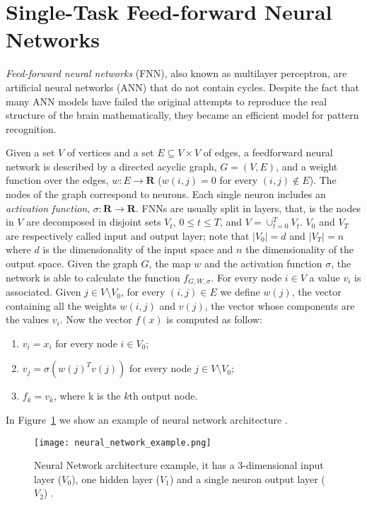 \section{Single-Task Feed-forward Neural Networks} \label{sec:singletaskNN}
\emph{Feed-forward neural networks} (FNN), also known as multilayer perceptron, are artificial neural networks (ANN) that do not contain cycles. Despite the fact that many ANN models have failed the original attempts to reproduce the real structure of the brain mathematically, they became an efficient model for pattern recognition. 

Given a set $V$ of vertices and a set  $E\subseteq V\times V$ of edges, a feedforward neural network is described by a directed acyclic graph, $G =
(V,E)$, and a weight function over the edges, $w : E \to \mathbf R$ ($w(i, j) = 0$
for every $(i, j) \notin E$). The nodes of the graph correspond to neurons. Each
single neuron includes an \emph{activation function},  $ \sigma : \mathbf R \to
\mathbf R$. FNNs are usually
split in layers, that, is the nodes in $V$ are decomposed in disjoint sets $V_t$, $0\leq t\leq T$,
and $V = \cup_{t = 0}^T V_t$. $V_0$ and
$V_T$ are respectively called input and output layer; note that $|V_0| = d$ and
$|V_T| = n$ where $d$ is the dimensionality of the input space and $n$ the
dimensionality of the output space. Given the graph $G$, the map $w$ and the
activation function $\sigma$, the network is able to calculate the function
$f_{G,W,\sigma}$. For every node $i \in V$ a value $v_i$ is associated. Given $j
\in V \setminus V_0$, for every $(i, j) \in E$ we define $w(j)$, the vector containing all
the weights $w(i, j)$ and $v(j)$, the vector whose components are the values $v_i$. Now the
vector $f(x)$ is computed as follow:
\begin{enumerate}
    \item $v_i = x_i$ for every node $i \in V_0$;
    \item $v_j = \sigma(w(j)^T v(j))$ for every node $j \in V \setminus V_0$;
    \item $f_k = v_k$, where k is the $k$th output node.
\end{enumerate}
In Figure~\ref{fig:neural_network_example} we show an example of neural network architecture \cite{ShwartzUnderstadningML, BishopML}.
\begin{figure}[ht]
\texttt{[image: neural\_network\_example.png]}
\caption{Neural Network architecture example, it has a 3-dimensional input layer
($V_0$), one hidden layer ($V_1$) and a single neuron output layer ($V_2$)
\cite{ShwartzUnderstadningML}.} 
\label{fig:neural_network_example}
\end{figure}

